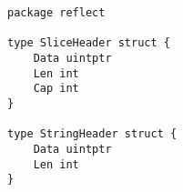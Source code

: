 \begin{lstlisting}[language=Golang, label=lst:reflect-header-types, caption=Reflect slice and string header types and API]
package reflect

type SliceHeader struct {
    Data uintptr
    Len int
    Cap int
}

type StringHeader struct {
    Data uintptr
    Len int
}
\end{lstlisting}
